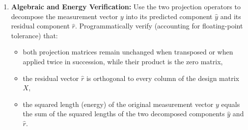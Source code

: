 \documentclass[12pt, letterpaper]{article}
\begin{document}
\begin{enumerate}
    \item \textbf{Algebraic and Energy Verification:} Use the two projection operators to decompose the measurement vector $y$ into its predicted component $\hat{y}$ and its residual component $\hat{r}$. Programmatically verify (accounting for floating-point tolerance) that:   
    \begin{itemize}
        \item both projection matrices remain unchanged when transposed or when applied twice in succession, while their product is the zero matrix,   
        \item the residual vector $\hat{r}$ is orthogonal to every column of the design matrix $X$,   
        \item the squared length (energy) of the original measurement vector $y$ equals the sum of the squared lengths of the two decomposed components $\hat{y}$ and $\hat{r}$.
    \end{itemize}
\end{enumerate}
\end{document}
